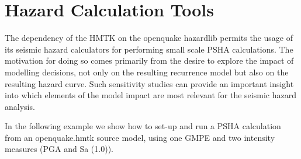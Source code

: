 \section{Hazard Calculation Tools}

The dependency of the HMTK on the openquake hazardlib permits the usage of its seismic hazard calculators for performing small scale PSHA calculations. The motivation for doing so comes primarily from the desire to explore the impact of modelling decisions, not only on the resulting recurrence model but also on the resulting hazard curve. Such sensitivity studies can provide an important insight into which elements of the model impact are most relevant for the seismic hazard analysis.

In the following example we show how to set-up and run a PSHA calculation from an openquake.hmtk source model, using one GMPE \parencite{akkar2010} and two intensity measures (PGA and Sa (1.0)). 

